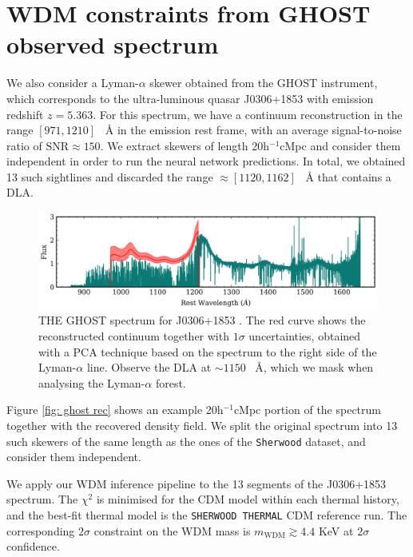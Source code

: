 \section{WDM constraints from GHOST observed spectrum}\label{sec:inference ghost}
We also consider a Lyman-$\alpha$ skewer obtained from the GHOST instrument, which corresponds to the ultra-luminous quasar J0306+1853 \cite{Wang_2015} with emission redshift $z=5.363$. For this spectrum, we have a continuum reconstruction in the range $[971, 1210]$ \textup{~\AA} in the emission rest frame, with an average signal-to-noise ratio of $\mathrm{SNR}\approx 150$. We extract skewers of length 20h$^{-1}$cMpc and consider them independent in order to run the neural network predictions. In total, we obtained 13 such sightlines and discarded the range $\approx [1120,1162]$ \textup{~\AA} that contains a DLA.


\begin{figure}
    \centering
    \includegraphics[width=0.7\linewidth]{img/ML/ghost_spectrum.png}
    \caption{THE GHOST spectrum for J0306+1853 \cite{Wang_2015}. The red curve shows the reconstructed continuum together with $1\sigma$ uncertainties, obtained with a PCA technique based on the spectrum to the right side of the Lyman-$\alpha$ line. Observe the DLA at $\sim 1150$ \textup{~\AA}, which we mask when analysing the Lyman-$\alpha$ forest. }
    \label{fig: ghost spectrum}
\end{figure}



Figure \ref{fig: ghost rec} shows an example 20h$^{-1}$cMpc portion of the spectrum together with the recovered density field. We split the original spectrum into 13 such skewers of the same length as the ones of the \texttt{Sherwood} dataset, and consider them independent.

We apply our WDM inference pipeline to the 13 segments of the J0306+1853 spectrum. The $\chi^2$ is minimised for the CDM model within each thermal history, and the best-fit thermal model is the \texttt{SHERWOOD THERMAL} CDM reference run. The corresponding $2\sigma$ constraint on the WDM mass is $m_{\mathrm{WDM}} \gtrsim 4.4$ KeV at $2\sigma$ confidence.




